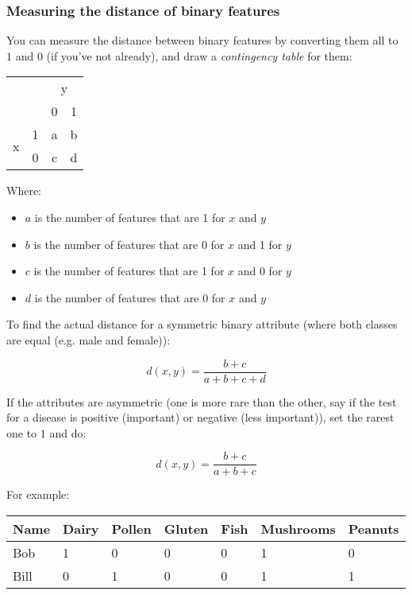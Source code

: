 \subsubsection{Measuring the distance of binary features}

You can measure the distance between binary features by converting them all to
$1$ and $0$ (if you've not already), and draw a \textit{contingency table} for
them:

\begin{table}[H]
  \centering
  \begin{tabular}{lc|cc}
    & \multicolumn{1}{l}{} & \multicolumn{2}{c}{y} \\
    & & 0 & 1 \\ \cline{2-4}
    \multirow{2}{*}{x} & 1 & a & b\\
    & 0 & c & d\\
  \end{tabular}
\end{table}

Where:
\begin{itemize}
  \item $a$ is the number of features that are 1 for $x$ and $y$
  \item $b$ is the number of features that are 0 for $x$ and 1 for $y$
  \item $c$ is the number of features that are 1 for $x$ and 0 for $y$
  \item $d$ is the number of features that are 0 for $x$ and $y$
\end{itemize}

To find the actual distance for a symmetric binary attribute (where both classes
are equal (e.g. male and female)):

\[
  d(x,y) = \frac{b + c}{a + b + c + d}
\]

If the attributes are asymmetric (one is more rare than the other, say if
the test for a disease is positive (important) or negative (less important)),
set the rarest one to $1$ and do:

\[
  d(x,y) = \frac{b + c}{a + b + c}
\]

For example:

\begin{center}
  \begin{tabular}{l llllll}
    Name & Dairy & Pollen & Gluten & Fish & Mushrooms & Peanuts\\ \hline
    Bob  & 1     & 0      & 0      & 0    & 1         & 0      \\
    Bill & 0     & 1      & 0      & 0    & 1         & 1      
  \end{tabular}
\end{center}


